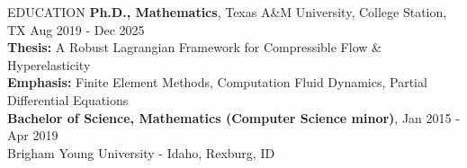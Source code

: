 \documentclass{resume} %
\begin{document}

\begin{rSection}{\stitle}

{\summary}

\end{rSection}


\begin{rSection}{EDUCATION}
{\bf Ph.D., Mathematics}, Texas A\&M University, College Station, TX \hfill {Aug 2019 - Dec 2025} \\
\textbf{Thesis:} A Robust Lagrangian Framework for Compressible Flow \& Hyperelasticity \\
\textbf{Emphasis:} Finite Element Methods, Computation Fluid Dynamics, Partial Differential Equations \\

{\bf Bachelor of Science, Mathematics (Computer Science minor)}, \hfill
{Jan 2015 - Apr 2019} \\
Brigham Young University - Idaho, Rexburg, ID 
\end{rSection}

\end{document}
